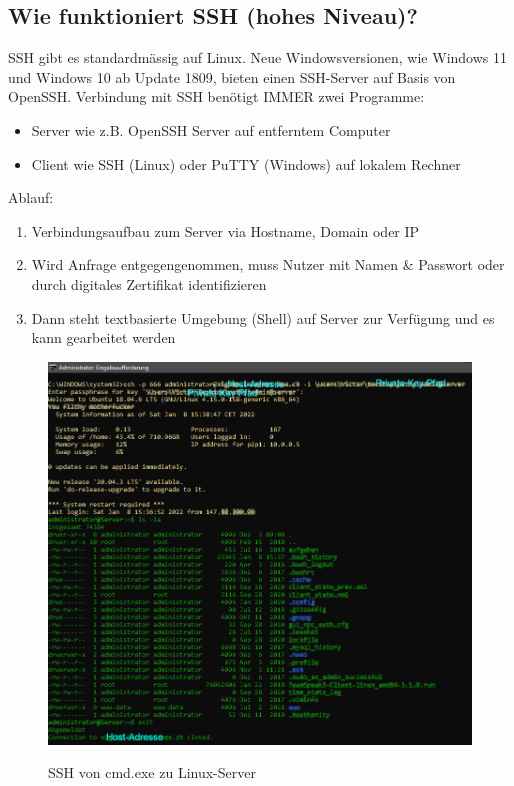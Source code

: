 \subsection*{Wie funktioniert SSH (hohes Niveau)?}
SSH gibt es standardmässig auf Linux. Neue Windowsversionen, wie Windows 11 und Windows 10 ab Update 1809, bieten einen SSH-Server auf Basis von OpenSSH.
Verbindung mit SSH benötigt IMMER zwei Programme:
\begin{itemize}
    \item Server wie z.B. OpenSSH Server auf entferntem Computer
    \item Client wie SSH (Linux) oder PuTTY (Windows) auf lokalem Rechner
\end{itemize}
Ablauf:
\begin{enumerate}
    \item Verbindungsaufbau zum Server via Hostname, Domain oder IP
    \item Wird Anfrage entgegengenommen, muss Nutzer mit Namen \& Passwort oder durch digitales Zertifikat identifizieren
    \item Dann steht textbasierte Umgebung (Shell) auf Server zur Verfügung und es kann gearbeitet werden
\end{enumerate}
\begin{figure}[H]
    \begin{center}
    \label{pic:SSH}
    \includegraphics[width=\textwidth]{images/ssh.jpg}
    \caption{SSH von cmd.exe zu Linux-Server}
    \end{center}
\end{figure}

